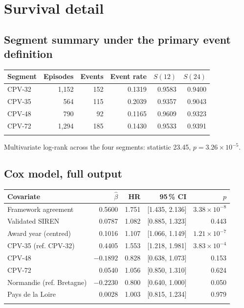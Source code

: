 \section{Survival detail}
\label{app:survival}

\subsection*{Segment summary under the primary event definition}

\begin{longtable}[]{@{}lrrrrr@{}}
\toprule\noalign{}
Segment & Episodes & Events & Event rate & $S(12)$ & $S(24)$ \\
\midrule\noalign{}
\endhead
CPV-32 & 1,152 & 152 & 0.1319 & 0.9583 & 0.9400 \\
CPV-35 & 564 & 115 & 0.2039 & 0.9357 & 0.9043 \\
CPV-48 & 790 & 92 & 0.1165 & 0.9609 & 0.9323 \\
CPV-72 & 1,294 & 185 & 0.1430 & 0.9533 & 0.9391 \\
\bottomrule\noalign{}
\end{longtable}

Multivariate log-rank across the four segments: statistic 23.45, $p = 3.26 \times 10^{-5}$.

\subsection*{Cox model, full output}

\begin{longtable}[]{@{}>{\raggedright\arraybackslash}p{4.6cm}rrrr@{}}
\toprule\noalign{}
Covariate & $\hat\beta$ & HR & 95\,\% CI & $p$ \\
\midrule\noalign{}
\endhead
Framework agreement & 0.5600 & 1.751 & [1.435, 2.136] & $3.38\times 10^{-8}$ \\
Validated SIREN & 0.0787 & 1.082 & [0.885, 1.323] & 0.443 \\
Award year (centred) & 0.1016 & 1.107 & [1.066, 1.149] & $1.21\times 10^{-7}$ \\
CPV-35 (ref. CPV-32) & 0.4405 & 1.553 & [1.218, 1.981] & $3.83\times 10^{-4}$ \\
CPV-48 & $-0.1892$ & 0.828 & [0.638, 1.073] & 0.153 \\
CPV-72 & 0.0540 & 1.056 & [0.850, 1.310] & 0.624 \\
Normandie (ref. Bretagne) & $-0.2230$ & 0.800 & [0.640, 1.000] & 0.050 \\
Pays de la Loire & 0.0028 & 1.003 & [0.815, 1.234] & 0.979 \\
\bottomrule\noalign{}
\end{longtable}

